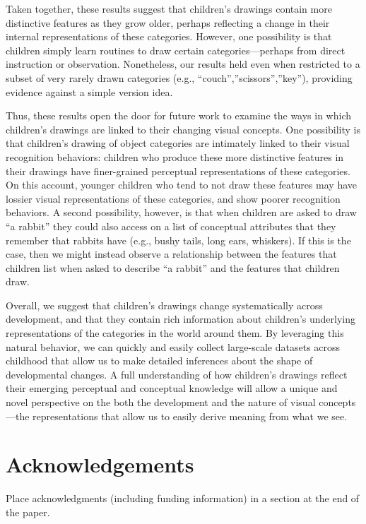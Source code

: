 \documentclass[10pt, letterpaper]{article}
\begin{document}
Taken together, these results suggest that children's drawings contain
more distinctive features as they grow older, perhaps reflecting a
change in their internal representations of these categories. However,
one possibility is that children simply learn routines to draw certain
categories---perhaps from direct instruction or observation.
Nonetheless, our results held even when restricted to a subset of very
rarely drawn categories (e.g., ``couch'',''scissors'',''key''),
providing evidence against a simple version idea.

Thus, these results open the door for future work to examine the ways in
which children's drawings are linked to their changing visual concepts.
One possibility is that children's drawing of object categories are
intimately linked to their visual recognition behaviors: children who
produce these more distinctive features in their drawings have
finer-grained perceptual representations of these categories. On this
account, younger children who tend to not draw these features may have
lossier visual representations of these categories, and show poorer
recognition behaviors. A second possibility, however, is that when
children are asked to draw ``a rabbit'' they could also access on a list
of conceptual attributes that they remember that rabbits have (e.g.,
bushy tails, long ears, whiskers). If this is the case, then we might
instead observe a relationship between the features that children list
when asked to describe ``a rabbit'' and the features that children draw.

Overall, we suggest that children's drawings change systematically
across development, and that they contain rich information about
children's underlying representations of the categories in the world
around them. By leveraging this natural behavior, we can quickly and
easily collect large-scale datasets across childhood that allow us to
make detailed inferences about the shape of developmental changes. A
full understanding of how children's drawings reflect their emerging
perceptual and conceptual knowledge will allow a unique and novel
perspective on the both the development and the nature of visual
concepts---the representations that allow us to easily derive meaning
from what we see.

\section{Acknowledgements}\label{acknowledgements}

Place acknowledgments (including funding information) in a section at
the end of the paper.
\end{document}
